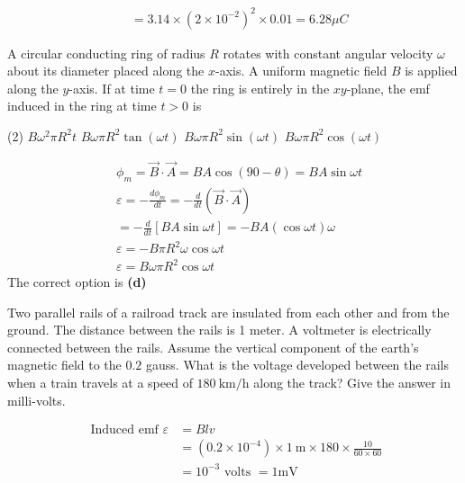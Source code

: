 \begin{enumerate}
\begin{answer}
\begin{align*}
		&=3.14 \times\left(2 \times 10^{-2}\right)^{2} \times 0.01=6.28 \mu C
		\end{align*}
	\end{answer}
	\begin{minipage}{\textwidth}
		\item A circular conducting ring of radius $R$ rotates with constant angular velocity $\omega$ about its diameter placed along the $x$-axis. A uniform magnetic field $B$ is applied along the $y$-axis. If at time $t=0$ the ring is entirely in the $x y$-plane, the emf induced in the ring at time $t>0$ is
	\end{minipage}
	\begin{tasks}(2)
		\task[\textbf{A.}] $B \omega^{2} \pi R^{2} t$
		\task[\textbf{B.}]$B \omega \pi R^{2} \tan (\omega t)$
		\task[\textbf{C.}]$B \omega \pi R^{2} \sin (\omega t)$
		\task[\textbf{D.}]$B \omega \pi R^{2} \cos (\omega t)$
	\end{tasks}
	\begin{answer}
		\begin{align*}
		&\phi_{m}=\vec{B} \cdot \vec{A}=B A \cos (90-\theta)=B A \sin \omega t\\
		&\varepsilon=-\frac{d \phi_{m}}{d t}=-\frac{d}{d t}(\vec{B} \cdot \vec{A})\\
		&=-\frac{d}{d t}[B A \sin \omega t]=-B A(\cos \omega t) \omega \\
		& \varepsilon=-B \pi R^{2} \omega \cos \omega t \\
		& \varepsilon=B \omega \pi R^{2} \cos \omega t
		\end{align*}
		The correct option is \textbf{(d)}
	\end{answer}
	\begin{minipage}{\textwidth}
		\item Two parallel rails of a railroad track are insulated from each other and from the ground. The distance between the rails is 1 meter. A voltmeter is electrically connected between the rails. Assume the vertical component of the earth's magnetic field to the $0.2$ gauss. What is the voltage developed between the rails when a train travels at a speed of $180 \mathrm{~km} / \mathrm{h}$ along the track? Give the answer in milli-volts.
	\end{minipage}
	\begin{answer}
		\begin{align*}
		\text { Induced emf } \varepsilon&=B l v\\&=\left(0.2 \times 10^{-4}\right) \times 1 \mathrm{~m} \times 180 \times \frac{10}{60 \times 60}\\&=10^{-3} \text { volts }=1 \mathrm{mV}
		\end{align*}
	

\end{answer}
\end{enumerate}
